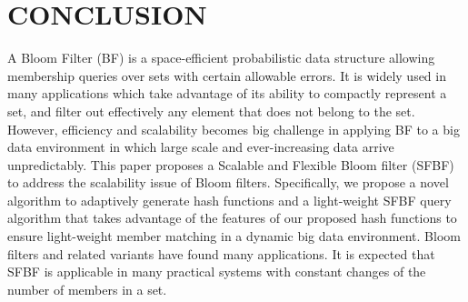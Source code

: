 \documentclass[10pt,journal,letterpaper]{IEEEtran}
\begin{document}
\section{CONCLUSION}
\label{sec:CONCLUSION}
A Bloom Filter (BF) is a space-efficient probabilistic data structure allowing membership queries over
sets with certain allowable errors. It is widely used in many applications which take advantage of
its ability to compactly represent a set, and filter out effectively any element that does not belong
to the set. However, efficiency and scalability becomes big challenge in applying BF to a big data environment in which large scale and ever-increasing data arrive unpredictably. This paper proposes a  Scalable and Flexible Bloom
filter (SFBF) to address the scalability issue of Bloom filters. Specifically, we propose a novel algorithm to adaptively generate hash functions and a light-weight SFBF query algorithm that takes advantage of the features of our proposed hash functions to ensure light-weight member matching in a dynamic big data environment. Bloom filters and related variants have found many applications. It is expected that SFBF is applicable in many practical systems with constant changes of the number of members in a set.



%
\end{document}
